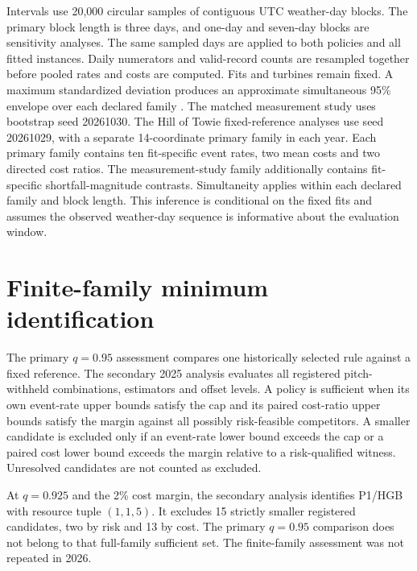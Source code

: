 Intervals use 20,000 circular samples of contiguous UTC weather-day blocks. The primary block length is three days, and one-day and seven-day blocks are sensitivity analyses. The same sampled days are applied to both policies and all fitted instances. Daily numerators and valid-record counts are resampled together before pooled rates and costs are computed. Fits and turbines remain fixed. A maximum standardized deviation produces an approximate simultaneous 95\% envelope over each declared family \cite{kunsch1989jackknife}. The matched measurement study uses bootstrap seed 20261030. The Hill of Towie fixed-reference analyses use seed 20261029, with a separate 14-coordinate primary family in each year. Each primary family contains ten fit-specific event rates, two mean costs and two directed cost ratios. The measurement-study family additionally contains fit-specific shortfall-magnitude contrasts. Simultaneity applies within each declared family and block length. This inference is conditional on the fixed fits and assumes the observed weather-day sequence is informative about the evaluation window.

\section{Finite-family minimum identification}
The primary $q=0.95$ assessment compares one historically selected rule against a fixed reference. The secondary 2025 analysis evaluates all registered pitch-withheld combinations, estimators and offset levels. A policy is sufficient when its own event-rate upper bounds satisfy the cap and its paired cost-ratio upper bounds satisfy the margin against all possibly risk-feasible competitors. A smaller candidate is excluded only if an event-rate lower bound exceeds the cap or a paired cost lower bound exceeds the margin relative to a risk-qualified witness. Unresolved candidates are not counted as excluded.

At $q=0.925$ and the 2\% cost margin, the secondary analysis identifies P1/HGB with resource tuple $(1,1,5)$. It excludes 15 strictly smaller registered candidates, two by risk and 13 by cost. The primary $q=0.95$ comparison does not belong to that full-family sufficient set. The finite-family assessment was not repeated in 2026.
